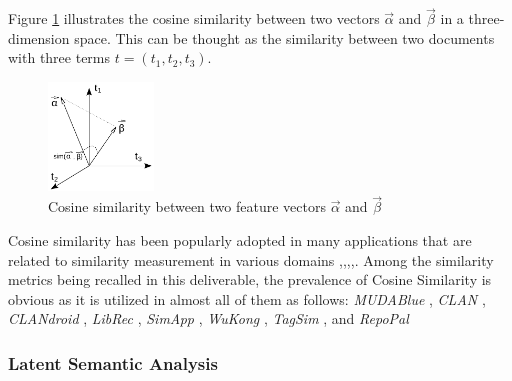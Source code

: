 Figure \ref{fig:Cosine} illustrates the cosine similarity between two vectors $\vec{\alpha}$ and $\vec{\beta}$ in a three-dimension space. This can be thought as the similarity between two documents with three terms $t=(t_{1},t_{2},t_{3})$.

\begin{figure}[h!]
	\centering
	\includegraphics[width=0.25\textwidth]{images/Cosine.pdf}
	\caption{Cosine similarity between two feature vectors $\vec{\alpha}$ and $\vec{\beta}$}
	\label{fig:Cosine}
\end{figure}

Cosine similarity has been popularly adopted in many applications that are related to similarity measurement in various domains \cite{Huang:2012:LCD:2343876.2343884},\cite{Islam:2008:STS:1376815.1376819},\cite{Linden:2003:ARI:642462.642471},\cite{conf:iscis:MadylovaO09},\cite{Mihalcea:2006:CKM:1597538.1597662}. Among the similarity metrics being recalled in this deliverable, the prevalence of Cosine Similarity is obvious as it is utilized in almost all of them as follows: \textit{MUDABlue} \cite{10.1109/APSEC.2004.69}, \textit{CLAN} \cite{McMillan:2012:DSS:2337223.2337267}, \textit{CLANdroid} \cite{10.1109ICPC.2016.7503721}, \textit{LibRec} \cite{6671293}, \textit{SimApp} \cite{Chen:2015:SFD:2684822.2685305}, \textit{WuKong} \cite{Wang:2015:WSA:2771783.2771795}, \textit{TagSim} \cite{Lo:2012:DSA:2473496.2473616}, and \textit{RepoPal} \cite{10.1109/SANER.2017.7884605}


\subsubsection{Latent Semantic Analysis}

